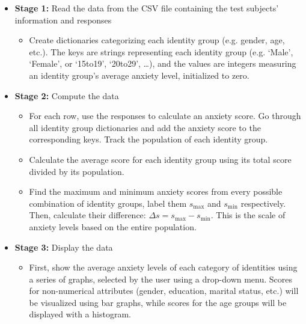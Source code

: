 \documentclass[fontsize=11pt]{article}
\begin{document}
    \begin{itemize}
        \item \textbf{Stage 1:} Read the data from the CSV file containing the test subjects’ information and responses

        \begin{itemize}
            \item Create dictionaries categorizing each identity group (e.g. gender, age, etc.).
            The keys are strings representing each identity group (e.g. `Male’, `Female’, or `15to19’, `20to29’, \dots), and the values are integers measuring an identity group’s average anxiety level, initialized to zero.
        \end{itemize}

        \item \textbf{Stage 2:} Compute the data

        \begin{itemize}
            \item For each row, use the responses to calculate an anxiety score.
            Go through all identity group dictionaries and add the anxiety score to the corresponding keys.
            Track the population of each identity group.

            \item Calculate the average score for each identity group using its total score divided by its population.

            \item Find the maximum and minimum anxiety scores from every possible combination of identity groups, label them $s_{\mathrm{max}}$ and $s_{\mathrm{min}}$ respectively.
            Then, calculate their difference: $\Delta s = s_{\mathrm{max}} - s_{\mathrm{min}}$.
            This is the scale of anxiety levels based on the entire population.
        \end{itemize}

        \item \textbf{Stage 3:} Display the data

        \begin{itemize}
            \item
            First, show the average anxiety levels of each category of identities using a series of graphs, selected by the user using a drop-down menu.
            Scores for non-numerical attributes (gender, education, marital status, etc.) will be visualized using bar graphs, while scores for the age groups will be displayed with a histogram.


\end{itemize}
\end{itemize}
\end{document}
